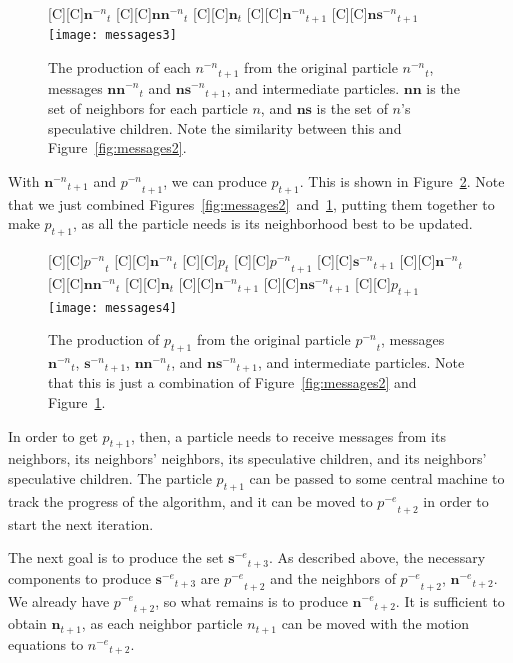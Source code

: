 \documentclass[journal,letterpaper]{IEEEtran}
\newcommand{\fig}[1]{Figure~\ref{fig:#1}}
\providecommand{\noeval}[1]{\ensuremath{#1^{-e}}}
\providecommand{\nonbest}[1]{\ensuremath{#1^{-n}}}
\providecommand{\p}{\ensuremath{p}}
\providecommand{\sset}{\ensuremath{\mathbf{s}}}
\providecommand{\nsset}{\ensuremath{\mathbf{ns}}}
\providecommand{\n}{\ensuremath{n}}
\providecommand{\nset}{\ensuremath{\mathbf{n}}}
\providecommand{\nnset}{\ensuremath{\mathbf{nn}}}
\begin{document}
\begin{figure}
  \centering
  [C][C]{$\nonbest{\nset}_{t}$}
  [C][C]{$\nonbest{\nnset}_{t}$}
  [C][C]{$\nset_{t}$}
  [C][C]{$\nonbest{\nset}_{t+1}$}
  [C][C]{$\nonbest{\nsset}_{t+1}$}
  \texttt{[image: messages3]}
  \caption{The production of each $\nonbest{\n}_{t+1}$ from the original
  particle $\nonbest{\n}_{t}$, messages $\nonbest{\nnset}_{t}$ and
  $\nonbest{\nsset}_{t+1}$, and intermediate particles.  $\nnset$ is the set of
  neighbors for each particle $\n$, and $\nsset$ is the set of $\n$'s
  speculative children.  Note the similarity between this and \fig{messages2}.}
  \label{fig:messages3}
\end{figure}

With $\nonbest{\nset}_{t+1}$ and $\nonbest{\p}_{t+1}$, we can produce
$\p_{t+1}$.  This is shown in \fig{messages4}.  Note that we just combined
Figures~\ref{fig:messages2}~and~\ref{fig:messages3}, putting them together
to make $\p_{t+1}$, as all the particle needs is its neighborhood best to be
updated.

\begin{figure}
  \centering
  [C][C]{$\nonbest{\p}_{t}$}
  [C][C]{$\nonbest{\nset}_{t}$}
  [C][C]{$\p_{t}$}
  [C][C]{$\nonbest{\p}_{t+1}$}
  [C][C]{$\nonbest{\sset}_{t+1}$}
  [C][C]{$\nonbest{\nset}_{t}$}
  [C][C]{$\nonbest{\nnset}_{t}$}
  [C][C]{$\nset_{t}$}
  [C][C]{$\nonbest{\nset}_{t+1}$}
  [C][C]{$\nonbest{\nsset}_{t+1}$}
  [C][C]{$\p_{t+1}$}
  \texttt{[image: messages4]}
  \caption{The production of $\p_{t+1}$ from the original particle 
  $\nonbest{\p}_{t}$, messages $\nonbest{\nset}_{t}$, $\nonbest{\sset}_{t+1}$,
  $\nonbest{\nnset}_{t}$, and $\nonbest{\nsset}_{t+1}$, and intermediate
  particles.  Note that this is just a combination of \fig{messages2} and
  \fig{messages3}.}
  \label{fig:messages4}
\end{figure}

In order to get $\p_{t+1}$, then, a particle needs to receive messages from its
neighbors, its neighbors' neighbors, its speculative children, and its
neighbors' speculative children.  The particle $\p_{t+1}$ can be passed to some
central machine to track the progress of the algorithm, and it can be moved to
$\noeval{\p}_{t+2}$ in order to start the next iteration.

The next goal is to produce the set $\noeval{\sset}_{t+3}$.  As described
above, the necessary components to produce $\noeval{\sset}_{t+3}$ are
$\noeval{\p}_{t+2}$ and the neighbors of $\noeval{\p}_{t+2}$,
$\noeval{\nset}_{t+2}$.  We already have $\noeval{\p}_{t+2}$, so what remains
is to produce $\noeval{\nset}_{t+2}$.  It is sufficient to obtain
$\nset_{t+1}$, as each neighbor particle $\n_{t+1}$ can be moved with the
motion equations to $\noeval{\n}_{t+2}$.
\end{document}
